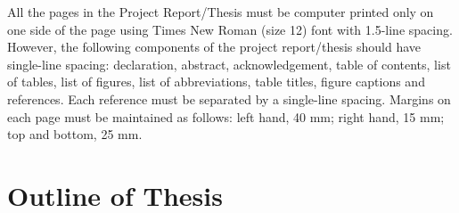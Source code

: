 All the pages in the Project Report/Thesis must be computer printed only on one side of the page using
Times New Roman (size 12) font with 1.5-line spacing.
However, the following components of the project report/thesis should have single-line spacing: declaration, abstract, acknowledgement, table of contents, list of tables, list of figures, list of abbreviations, table titles, figure captions and references. 
Each reference must be separated by a single-line spacing. Margins on each page must be maintained as
follows: left hand, 40 mm; right hand, 15 mm; top and bottom, 25 mm.


\citet{Streftaris2004} 
 
\section{Outline of Thesis}